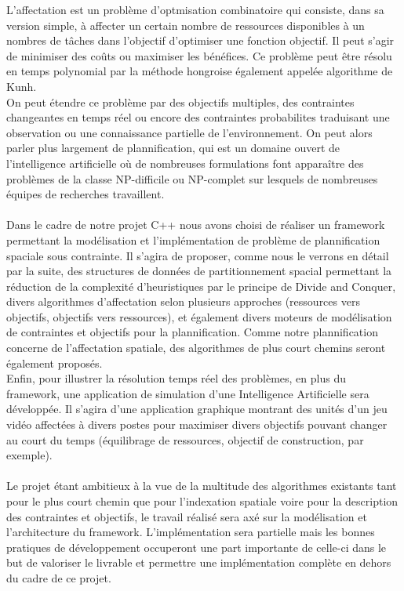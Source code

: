 L'affectation est un problème d'optmisation combinatoire qui consiste, dans sa version simple, à affecter un certain nombre de ressources disponibles à un nombres de tâches dans l'objectif d'optimiser une fonction objectif. Il peut s'agir de minimiser des coûts ou maximiser les bénéfices. Ce problème peut être résolu en temps polynomial par la méthode hongroise également appelée algorithme de Kunh.\\
On peut étendre ce problème par des objectifs multiples, des contraintes changeantes en temps réel ou encore des contraintes probabilites traduisant une observation ou une connaissance partielle de l'environnement. On peut alors parler plus largement de plannification, qui est un domaine ouvert de l'intelligence artificielle où de nombreuses formulations font apparaître des problèmes de la classe NP-difficile ou NP-complet sur lesquels de nombreuses équipes de recherches travaillent.\\\\

Dans le cadre de notre projet C++ nous avons choisi de réaliser un framework permettant la modélisation et l'implémentation de problème de plannification spaciale sous contrainte. Il s'agira de proposer, comme nous le verrons en détail par la suite, des structures de données de partitionnement spacial permettant la réduction de la complexité d'heuristiques par le principe de Divide and Conquer, divers algorithmes d'affectation selon plusieurs approches (ressources vers objectifs, objectifs vers ressources), et également divers moteurs de modélisation de contraintes et objectifs pour la plannification. Comme notre plannification concerne de l'affectation spatiale, des algorithmes de plus court chemins seront également proposés.\\
Enfin, pour illustrer la résolution temps réel des problèmes, en plus du framework, une application de simulation d'une Intelligence Artificielle sera développée. Il s'agira d'une application graphique montrant des unités d'un jeu vidéo affectées à divers postes pour maximiser divers objectifs pouvant changer au court du temps (équilibrage de ressources, objectif de construction, par exemple).\\\\

Le projet étant ambitieux à la vue de la multitude des algorithmes existants tant pour le plus court chemin que pour l'indexation spatiale voire pour la description des contraintes et objectifs, le travail réalisé sera axé sur la modélisation et l'architecture du framework. L'implémentation sera partielle mais les bonnes pratiques de développement occuperont une part importante de celle-ci dans le but de valoriser le livrable et permettre une implémentation complète en dehors du cadre de ce projet.\\\\

